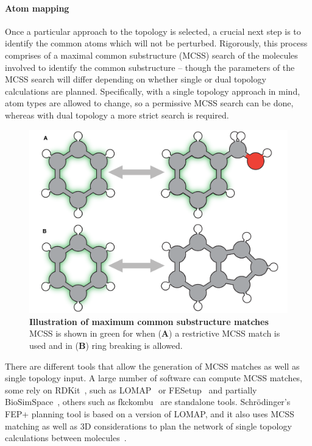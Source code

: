 \documentclass[9pt,bestpractices]{livecoms}
\begin{document}
\paragraph{Atom mapping}
Once a particular approach to the topology is selected, a crucial next step is to identify the common atoms which will not be perturbed.
Rigorously, this process comprises of a maximal common substructure (MCSS) search of the molecules involved to identify the common substructure -- though the parameters of the MCSS search will differ depending on whether single or dual topology calculations are planned.
Specifically, with a single topology approach in mind, atom types are allowed to change, so a permissive MCSS search can be done, whereas with dual topology a more strict search is required.
\begin{figure}[h!]
    \includegraphics[width=0.95\linewidth]{figures/fig4_mcs/Figure.pdf}
    \caption{\textbf{Illustration of maximum common substructure matches} MCSS is shown in green for when (\textbf{A}) a restrictive MCSS match is used and in (\textbf{B}) ring breaking is allowed.}
    \label{fig:fig_mcss}
\end{figure} 
%
There are different tools that allow the generation of MCSS matches as well as single topology input. A large number of software can compute MCSS matches, some rely on RDKit~\cite{rdkit2019Dec}, such as LOMAP~\cite{liu2013lead} or FESetup~\cite{loeffler2015fesetup} and partially BioSimSpace~\cite{hedges2019biosimspace}, others such as fkckombu~\cite{kawabata20143d} are standalone tools. Schr\"{o}dinger's FEP+ planning tool is based on a version of LOMAP, and it also uses MCSS matching as well as 3D considerations to plan the network of single topology calculations between molecules~\cite{wang2015accurate}. 
\end{document}
